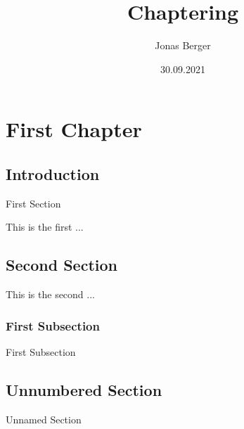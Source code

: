 \documentclass[12pt, letterpaper]{book}
\title{Chaptering}
\author{Jonas Berger}
\date{30.09.2021}
\begin{document}
\maketitle

\chapter{First Chapter}

\section{Introduction}
First Section

This is the first ...

\section{Second Section}
This is the second ...

\subsection{First Subsection}
First Subsection

\section*{Unnumbered Section}
Unnamed Section
\end{document}

